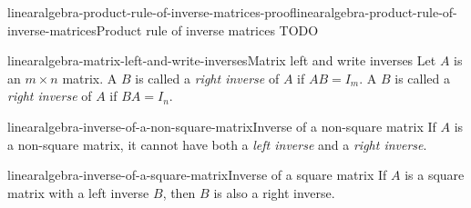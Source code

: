 \documentclass[preview]{standalone}
\begin{document}
\begin{snippetproof}{linearalgebra-product-rule-of-inverse-matrices-proof}{linearalgebra-product-rule-of-inverse-matrices}{Product rule of inverse matrices}
    TODO
\end{snippetproof}

\begin{snippetdefinition}{linearalgebra-matrix-left-and-write-inverses}{Matrix left and write inverses}
    Let \(A\) is an \(m \times n\) matrix. A \matrix \(B\)
    is called a \textit{right inverse} of \(A\)
    if \(AB=I_m\).
    A \matrix \(B\) is called a \textit{right inverse} of \(A\)
    if \(BA=I_n\).
\end{snippetdefinition}

\begin{snippetproposition}{linearalgebra-inverse-of-a-non-square-matrix}{Inverse of a non-square matrix}
    If \(A\) is a non-square matrix, it cannot have
    both a \textit{left inverse} and a \textit{right inverse}.
\end{snippetproposition}

\begin{snippetproposition}{linearalgebra-inverse-of-a-square-matrix}{Inverse of a square matrix}
    If \(A\) is a square matrix
    with a left inverse \(B\),
    then \(B\) is also a right inverse.
\end{snippetproposition}
\end{document}
